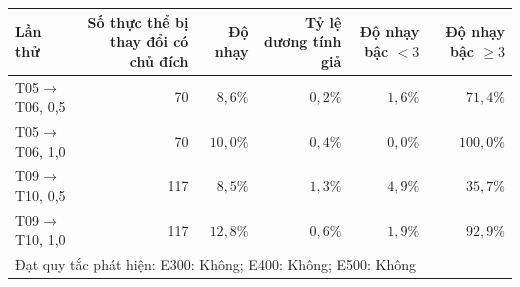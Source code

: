 \begin{tabular}{lrrrrr}
\toprule
Lần thử & Số thực thể bị thay đổi có chủ đích & Độ nhạy & Tỷ lệ dương tính giả & Độ nhạy bậc $<3$ & Độ nhạy bậc $\geq 3$ \\
\midrule
T05$\to$T06, 0,5 & 70 & $8{,}6\%$ & $0{,}2\%$ & $1{,}6\%$ & $71{,}4\%$ \\
T05$\to$T06, 1,0 & 70 & $10{,}0\%$ & $0{,}4\%$ & $0{,}0\%$ & $100{,}0\%$ \\
T09$\to$T10, 0,5 & 117 & $8{,}5\%$ & $1{,}3\%$ & $4{,}9\%$ & $35{,}7\%$ \\
T09$\to$T10, 1,0 & 117 & $12{,}8\%$ & $0{,}6\%$ & $1{,}9\%$ & $92{,}9\%$ \\
\midrule
\multicolumn{6}{l}{Đạt quy tắc phát hiện: E300: Không; E400: Không; E500: Không} \\
\bottomrule
\end{tabular}
